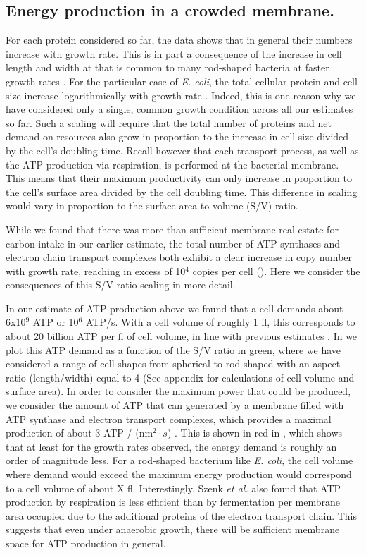 \subsection{Energy production in a crowded membrane.}

For each protein considered so far, the data shows that in general their numbers
increase with growth rate. This is in part a consequence of the increase in cell
length and width at that is common to many rod-shaped bacteria at faster growth
rates \citep{ojkic2019, harris2018}. For the particular case of \textit{E.
coli}, the total cellular protein and cell size increase logarithmically with
growth rate \citep{schaechter1958, si2017}. Indeed, this is one reason why we
have considered only a single, common growth condition across all our estimates
so far. Such a scaling will require that the total number of proteins and net
demand on resources also grow in proportion to the increase in cell size divided
by the cell's doubling time. Recall however that each transport process, as well
as the ATP production via respiration, is performed at the bacterial membrane.
This means that their maximum productivity can only increase in proportion to
the cell's surface area divided by the cell doubling time. This difference in
scaling would vary in proportion to the surface area-to-volume (S/V) ratio.

While we found that there was more than sufficient membrane real estate for
carbon intake in our earlier estimate, the total number of ATP synthases and
electron chain transport complexes both exhibit a clear increase in copy number
with growth rate, reaching in excess of 10$^4$ copies per cell
(). Here we consider the consequences of this
S/V ratio scaling in more detail.

In our estimate of ATP production above we found that a cell demands about
6x10$^9$ ATP or 10$^6$ ATP/s. With a cell volume of roughly 1 fl, this
corresponds to about 20 billion ATP per fl of cell volume, in line  with
previous estimates \citep{stouthamer1977, szenk2017}. In 
we plot this ATP demand as a function of the S/V ratio in green, where we have
considered a range of cell shapes from spherical to rod-shaped with an aspect
ratio (length/width) equal to 4 (See appendix for calculations of cell volume
and surface area).  In order to consider the maximum power that could be
produced, we consider the amount of ATP that can generated by a membrane filled
with ATP synthase and electron transport complexes, which provides a maximal
production of about 3 ATP / (nm$^2 \cdot s$) \citep{szenk2017}. This is shown in
red in , which shows that at least for the growth rates
observed, the energy demand is roughly an order of magnitude less.  For a
rod-shaped bacterium like \textit{E. coli}, the cell volume where demand would
exceed the maximum energy production would correspond to a cell volume of about
X fl. Interestingly, Szenk \textit{et al.} also found that ATP production by
respiration is less efficient than by fermentation per membrane area occupied
due to the additional proteins of the electron transport chain. This suggests
that even under anaerobic growth, there will be sufficient membrane space for
ATP production in general.

